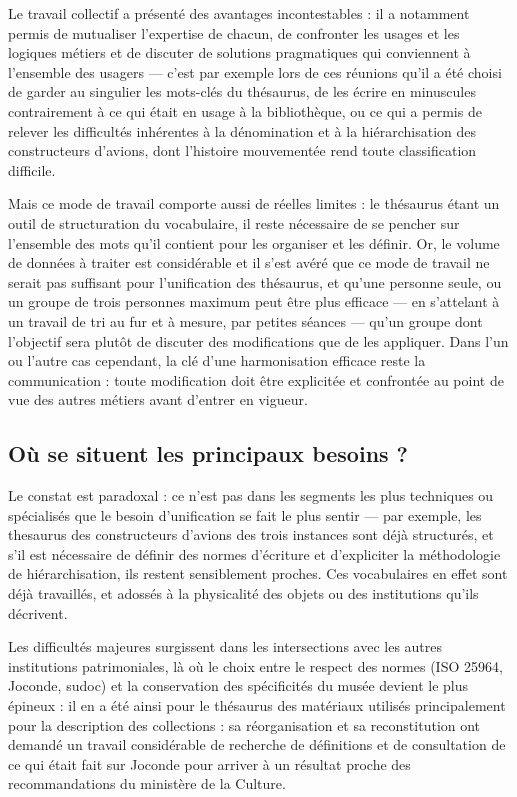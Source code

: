 Le travail collectif a présenté des avantages incontestables : il a notamment permis de mutualiser l'expertise de chacun, de confronter les usages et les logiques métiers et de discuter de solutions pragmatiques qui conviennent à l'ensemble des usagers --- c'est par exemple lors de ces réunions qu'il a été choisi de garder au singulier les mots-clés du thésaurus, de les écrire en minuscules contrairement à ce qui était en usage à la bibliothèque, ou ce qui a permis de relever les difficultés inhérentes à la dénomination et à la hiérarchisation des constructeurs d'avions, dont l'histoire mouvementée rend toute classification difficile.

Mais ce mode de travail comporte aussi de réelles limites : le thésaurus étant un outil de structuration du vocabulaire, il reste nécessaire de se pencher sur l'ensemble des mots qu'il contient pour les organiser et les définir. Or, le volume de données à traiter est considérable et il s'est avéré que ce mode de travail ne serait pas suffisant pour l'unification des thésaurus, et qu'une personne seule, ou un groupe de trois personnes maximum peut être plus efficace --- en s'attelant à un travail de tri au fur et à mesure, par petites séances --- qu'un groupe dont l'objectif sera plutôt de discuter des modifications que de les appliquer. Dans l'un ou l'autre cas cependant, la clé d'une harmonisation efficace reste la communication : toute modification doit être explicitée et confrontée au point de vue des autres métiers avant d'entrer en vigueur.


\subsection{Où se situent les principaux besoins ?}

Le constat est paradoxal : ce n’est pas dans les segments les plus techniques ou spécialisés que le besoin d’unification se fait le plus sentir --- par exemple, les \gls{thesaurus} des constructeurs d'avions des trois instances sont déjà structurés, et s'il est nécessaire de définir des normes d'écriture et d'expliciter la méthodologie de hiérarchisation, ils restent sensiblement proches. Ces vocabulaires en effet sont déjà travaillés, et adossés à la physicalité des objets ou des institutions qu'ils décrivent. 

Les difficultés majeures surgissent dans les intersections avec les autres institutions patrimoniales, là où le choix entre le respect des normes (ISO 25964, Joconde, \ac{sudoc}) et la conservation des spécificités du musée devient le plus épineux : il en a été ainsi pour le thésaurus des matériaux utilisés principalement pour la description des collections : sa réorganisation et sa reconstitution ont demandé un travail considérable de recherche de définitions et de consultation de ce qui était fait sur Joconde pour arriver à un résultat proche des recommandations du ministère de la Culture.
